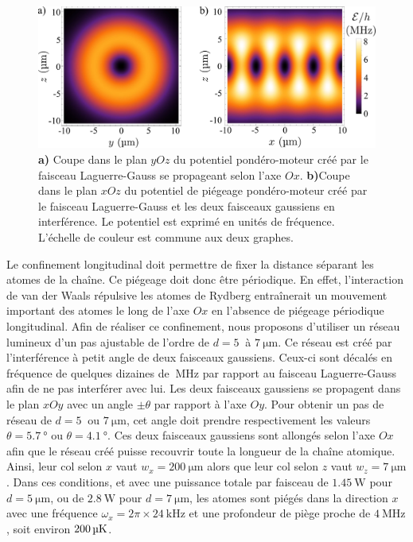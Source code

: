 \begin{figure}[h]
\centering
\includegraphics[width=\linewidth]{figures/circsim/pondero_trap}
\caption[Potentiel de piégeage pondéro-moteur]{
\textbf{a)} Coupe dans le plan $yOz$ du potentiel pondéro-moteur créé par le faisceau Laguerre-Gauss se propageant selon l'axe $Ox$.
\textbf{b)}Coupe dans le plan $xOz$ du potentiel de piégeage pondéro-moteur créé par le faisceau Laguerre-Gauss et les deux faisceaux gaussiens en interférence.
Le potentiel est exprimé en unités de fréquence. L'échelle de couleur est commune aux deux graphes.
}
\label{fig:pondero_trap}
\end{figure}
	
Le confinement longitudinal doit permettre de fixer la distance séparant les atomes de la chaîne.
Ce piégeage doit donc être périodique.
En effet, l'interaction de van der Waals répulsive les atomes de Rydberg entraînerait un mouvement important des atomes le long de l'axe $Ox$ en l'absence de piégeage périodique longitudinal.
Afin de réaliser ce confinement, nous proposons d'utiliser un réseau lumineux d'un pas ajustable de l'ordre de $d=\SI{5}{}$ à $\SI{7}{\um}$.
Ce réseau est créé par l'interférence à petit angle de deux faisceaux gaussiens.
Ceux-ci sont décalés en fréquence de quelques dizaines de $\SI{}{\MHz}$ par rapport au faisceau Laguerre-Gauss afin de ne pas interférer avec lui.
Les deux faisceaux gaussiens se propagent dans le plan $xOy$ avec un angle $\pm \theta$ par rapport à l'axe $Oy$.
Pour obtenir un pas de réseau de $d=\SI{5}{}$ ou $\SI{7}{\um}$, cet angle doit prendre respectivement les valeurs $\theta=\SI{5.7}{\degree}$ ou $\theta = \SI{4.1}{\degree}$.
Ces deux faisceaux gaussiens sont allongés selon l'axe $Ox$ afin que le réseau créé puisse recouvrir toute la longueur de la chaîne atomique.
Ainsi, leur col selon $x$ vaut $w_x = \SI{200}{\um}$ alors que leur col selon $z$ vaut $w_z=\SI{7}{\um}$.
Dans ces conditions, et avec une puissance totale par faisceau de $\SI{1.45}{\watt}$ pour $d=\SI{5}{\um}$, ou de $\SI{2.8}{\watt}$ pour $d=\SI{7}{\um}$, les atomes sont piégés dans la direction $x$ avec une fréquence $\omega_x = 2\pi \times \SI{24}{\kHz}$ et une profondeur de piège proche de $\SI{4}{\MHz}$, soit environ $\SI{200}{\si{\micro\kelvin}}$.

